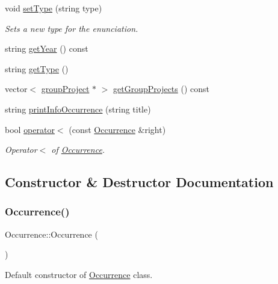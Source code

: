 \begin{DoxyCompactItemize}
void \hyperlink{class_occurrence_a8073f785d9f29ad053fec276c5906531}{set\+Type} (string type)
\begin{DoxyCompactList}\small\item\em Sets a new type for the enunciation. \end{DoxyCompactList}\item 
string \hyperlink{class_occurrence_a47363caf55016c2c32641fa7e3f7ae69}{get\+Year} () const
\item 
string \hyperlink{class_occurrence_afc85c969e4211d55707b759b0b58eda0}{get\+Type} ()
\item 
vector$<$ \hyperlink{classgroup_project}{group\+Project} $\ast$ $>$ \hyperlink{class_occurrence_ab6e9beff62ff5738494b2618b850543b}{get\+Group\+Projects} () const
\item 
string \hyperlink{class_occurrence_abdd15553f837a9bc6979908afbb39787}{print\+Info\+Occurrence} (string title)
\item 
bool \hyperlink{class_occurrence_a798338bb904c0320817ba139139a548a}{operator$<$} (const \hyperlink{class_occurrence}{Occurrence} \&right)
\begin{DoxyCompactList}\small\item\em Operator$<$ of \hyperlink{class_occurrence}{Occurrence}. \end{DoxyCompactList}\end{DoxyCompactItemize}


\subsection{Constructor \& Destructor Documentation}
\mbox{\label{class_occurrence_a63911c7c452d1a43cbe135150c8c7764}} 
\subsubsection{\texorpdfstring{Occurrence()}{Occurrence()}\hspace{0.1cm}{\footnotesize\ttfamily [1/2]}}
{\footnotesize\ttfamily Occurrence\+::\+Occurrence (\begin{DoxyParamCaption}{ }\end{DoxyParamCaption})}



Default constructor of \hyperlink{class_occurrence}{Occurrence} class. 

